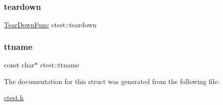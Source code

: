 \subsubsection{\texorpdfstring{teardown}{teardown}}
{\footnotesize\ttfamily \mbox{\hyperlink{ctest_8h_a4ec8c3cb86c5d196d45fb020b1b8cabc}{Tear\+Down\+Func}} ctest\+::teardown}

\mbox{\label{structctest_a18c814d874c53cd386192525a2045954}} 
\subsubsection{\texorpdfstring{ttname}{ttname}}
{\footnotesize\ttfamily const char$\ast$ ctest\+::ttname}



The documentation for this struct was generated from the following file\+:\begin{DoxyCompactItemize}
\item 
\mbox{\hyperlink{ctest_8h}{ctest.\+h}}\end{DoxyCompactItemize}
